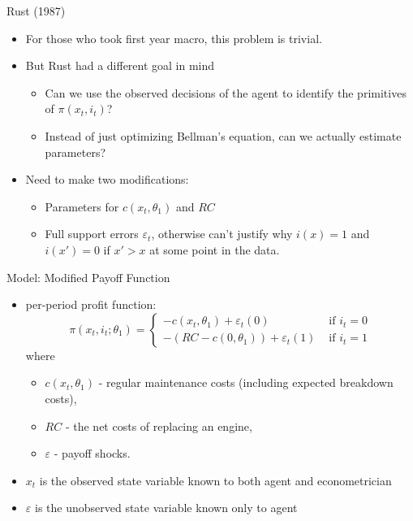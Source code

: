 \documentclass[xcolor=pdftex,dvipsnames,table,mathserif,aspectratio=169]{beamer}
\begin{document}
\begin{frame}{Rust (1987)}
\begin{itemize}
\item For those who took first year macro, this problem is trivial. 
\item But Rust had a different goal in mind
\begin{itemize}
\item Can we use the observed decisions of the agent to identify the primitives of $\pi(x_t,i_t)$?
\item Instead of just optimizing Bellman's equation, can we actually \alert{estimate parameters}?
\end{itemize}
\item Need to make two modifications: 
\begin{itemize}
\item Parameters for $c(x_t,\theta_1)$ and $RC$
\item Full support errors $\varepsilon_{t}$, otherwise can't justify why $i(x)=1$ and $i(x')=0$ if $x'>x$ at some point in the data.
\end{itemize}
\end{itemize}
\end{frame}

\begin{frame}{Model: Modified Payoff Function}
\begin{itemize}
	\item per-period profit function:\[
		\pi \left(x_{t},i_{t}; \theta_{1}\right)=
		\begin{cases}
		-c\left(x_{t},\theta_{1}\right)+\varepsilon_{t}\left(0\right) & \mbox{ if }i_{t}=0\\		
		-\left(RC-c\left(0,\theta_{1}\right)\right)+\varepsilon_{t}\left(1\right) & \mbox{ if }i_{t}=1
		\end{cases}
		\]
	where \\
	\begin{itemize}
		\item $c\left(x_{t},\theta_{1}\right) $ -  regular maintenance costs (including expected breakdown costs),
		\item $RC$ - the net costs of replacing an engine,
		\item $\varepsilon$ - payoff shocks.
	\end{itemize}
	
	\item $x_{t}$ is the \alert{observed state variable} known to both agent and econometrician
	\item $\varepsilon$ is the \alert{unobserved state variable} known only to agent
\end{itemize}
\end{frame}
\end{document}

